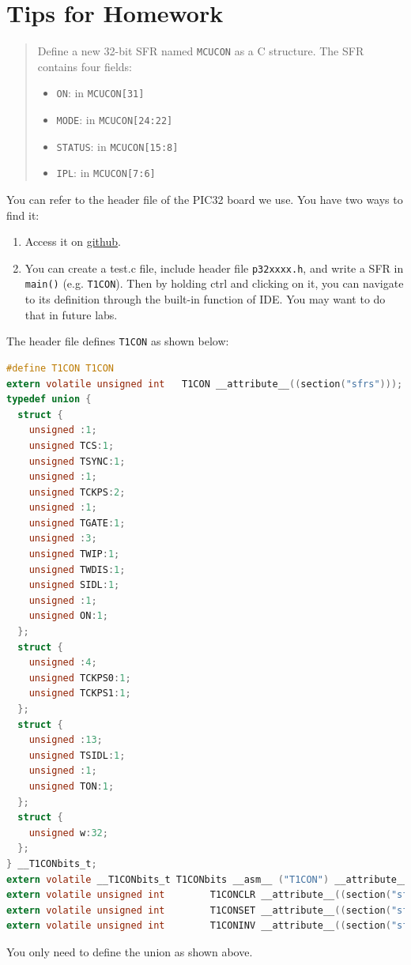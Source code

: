 \documentclass[a4paper]{article}
\begin{document}
\section*{Tips for Homework}
  \begin{quotation}
    Define a new 32-bit SFR named \verb|MCUCON| as a C structure. The SFR contains four fields:
    \begin{itemize}[leftmargin = 1cm]
      \item \verb|ON|: in \verb|MCUCON[31]|
      \item \verb|MODE|: in \verb|MCUCON[24:22]|
      \item \verb|STATUS|: in \verb|MCUCON[15:8]|
      \item \verb|IPL|: in \verb|MCUCON[7:6]|
    \end{itemize}
  \end{quotation}
  \par You can refer to the header file of the PIC32 board we use. You have two ways to find it:
  \begin{enumerate}[label = \arabic*.]
    \item Access it on \href{https://github.com/jasonkajita/pic32-part-support/blob/master/include/proc/p32mx795f512l.h}{github}.
    \item You can create a test.c file, include header file \verb|p32xxxx.h|, and write a SFR in \verb|main()| (e.g. \verb|T1CON|). Then by holding ctrl and clicking on it, you can navigate to its definition through the built-in function of IDE\@. You may want to do that in future labs.
  \end{enumerate}
  \par The header file defines \verb|T1CON| as shown below:
  \begin{lstlisting}[language=c]
#define T1CON T1CON
extern volatile unsigned int   T1CON __attribute__((section("sfrs")));
typedef union {
  struct {
    unsigned :1;
    unsigned TCS:1;
    unsigned TSYNC:1;
    unsigned :1;
    unsigned TCKPS:2;
    unsigned :1;
    unsigned TGATE:1;
    unsigned :3;
    unsigned TWIP:1;
    unsigned TWDIS:1;
    unsigned SIDL:1;
    unsigned :1;
    unsigned ON:1;
  };
  struct {
    unsigned :4;
    unsigned TCKPS0:1;
    unsigned TCKPS1:1;
  };
  struct {
    unsigned :13;
    unsigned TSIDL:1;
    unsigned :1;
    unsigned TON:1;
  };
  struct {
    unsigned w:32;
  };
} __T1CONbits_t;
extern volatile __T1CONbits_t T1CONbits __asm__ ("T1CON") __attribute__((section("sfrs")));
extern volatile unsigned int        T1CONCLR __attribute__((section("sfrs")));
extern volatile unsigned int        T1CONSET __attribute__((section("sfrs")));
extern volatile unsigned int        T1CONINV __attribute__((section("sfrs")));
  \end{lstlisting}
  \par You only need to define the union as shown above.
\end{document}
